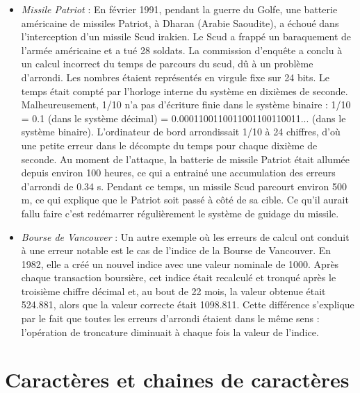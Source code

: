 \documentclass{magnoliaold}
\begin{document}
\begin{itemize}
\item \emph{Missile Patriot} : En février 1991, pendant la guerre du Golfe, une batterie américaine de
missiles Patriot, à Dharan (Arabie Saoudite), a échoué dans l'interception d'un
missile Scud irakien. Le Scud a frappé un baraquement de l'armée américaine
et a tué 28 soldats. La commission d'enquête a conclu à un calcul incorrect du
temps de parcours du scud, dû à un problème d'arrondi. Les nombres étaient représentés
en virgule fixe sur 24 bits. Le temps était compté par
l'horloge interne du système en dixièmes de seconde. Malheureusement, 1/10 n'a pas
d'écriture finie dans le système binaire : 1/10 = 0.1 (dans le système décimal)
= 0.0001100110011001100110011... (dans le système binaire). L'ordinateur de
bord arrondissait 1/10 à 24 chiffres, d'où une petite erreur dans le décompte
du temps pour chaque dixième de seconde. Au moment de l'attaque, la batterie
de missile Patriot était allumée depuis environ 100 heures, ce qui a entrainé
une accumulation des erreurs d'arrondi de 0.34 s. Pendant ce temps, un missile
Scud parcourt environ 500 m, ce qui explique que le Patriot soit passé à côté de
sa cible. Ce qu'il aurait fallu faire c'est redémarrer régulièrement le système
de guidage du missile.
\item \emph{Bourse de Vancouver} : Un autre exemple où les erreurs de calcul ont conduit à une erreur notable
est le cas de l'indice de la Bourse de Vancouver. En 1982, elle a créé un nouvel
indice avec une valeur nominale de 1000. Après chaque transaction boursière,
cet indice était recalculé et tronqué après le troisième chiffre décimal et, au bout
de 22 mois, la valeur obtenue était 524.881, alors que la valeur correcte était
1098.811. Cette différence s'explique par le fait que toutes les erreurs d'arrondi
étaient dans le même sens : l'opération de troncature diminuait à chaque fois la
valeur de l'indice.
\end{itemize}

\section{Caractères et chaines de caractères}
\end{document}
